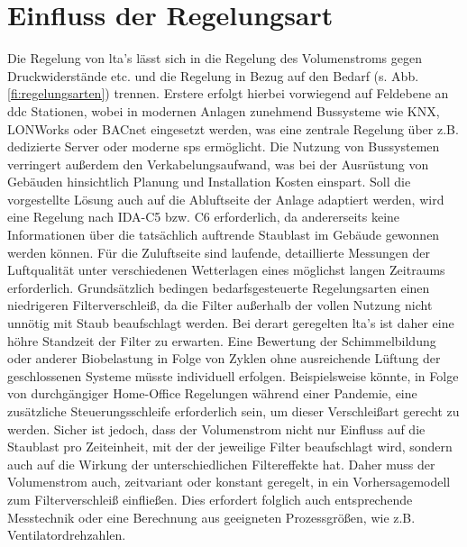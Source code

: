     \section{Einfluss der Regelungsart}
    \label{sec:regelungsart}
    Die Regelung von \ac{lta}'s lässt sich in die Regelung des Volumenstroms gegen Druckwiderstände etc. und die Regelung in Bezug auf den Bedarf (s. Abb. \ref{fi:regelungsarten}) trennen. Erstere erfolgt hierbei vorwiegend auf Feldebene an \ac{ddc} Stationen, wobei in modernen Anlagen zunehmend Bussysteme wie KNX, LONWorks oder BACnet eingesetzt werden, was eine zentrale Regelung über z.B. dedizierte Server oder moderne \ac{sps} ermöglicht. Die Nutzung von Bussystemen verringert außerdem den Verkabelungsaufwand, was bei der Ausrüstung von Gebäuden hinsichtlich Planung und Installation Kosten einspart. \newline
    Soll die vorgestellte Lösung auch auf die Abluftseite der Anlage adaptiert werden, wird eine Regelung nach IDA-C5 bzw. C6 erforderlich, da andererseits keine Informationen über die tatsächlich auftrende Staublast im Gebäude gewonnen werden können. Für die Zuluftseite sind laufende, detaillierte Messungen der Luftqualität unter verschiedenen Wetterlagen eines möglichst langen Zeitraums erforderlich.
    Grundsätzlich bedingen bedarfsgesteuerte Regelungsarten einen niedrigeren Filterverschleiß, da die Filter außerhalb der vollen Nutzung nicht unnötig mit Staub beaufschlagt werden. Bei derart geregelten \ac{lta}'s ist daher eine höhre Standzeit der Filter zu erwarten. Eine Bewertung der Schimmelbildung oder anderer Biobelastung in Folge von Zyklen ohne ausreichende Lüftung der geschlossenen Systeme müsste individuell erfolgen. Beispielsweise könnte, in Folge von durchgängiger Home-Office Regelungen während einer Pandemie, eine zusätzliche Steuerungsschleife erforderlich sein, um dieser Verschleißart gerecht zu werden.
    Sicher ist jedoch, dass der Volumenstrom nicht nur Einfluss auf die Staublast pro Zeiteinheit, mit der der jeweilige Filter beaufschlagt wird, sondern auch auf die Wirkung der unterschiedlichen Filtereffekte hat. Daher muss der Volumenstrom auch, zeitvariant oder konstant geregelt, in ein Vorhersagemodell zum Filterverschleiß einfließen. Dies erfordert folglich auch entsprechende Messtechnik oder eine Berechnung aus geeigneten Prozessgrößen, wie z.B. Ventilatordrehzahlen.

